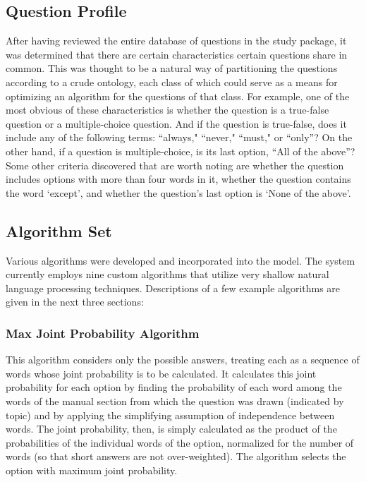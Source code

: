\subsection{Question Profile}

After having reviewed the entire database of questions in the study package, it was determined that there are certain characteristics certain questions share in common.  This was thought to be a natural way of partitioning the questions according to a crude ontology, each class of which could serve as a means for optimizing an algorithm for the questions of that class.  For example, one of the most obvious of these characteristics is whether the question is a true-false question or a multiple-choice question.  And if the question is true-false, does it include any of the following terms:  ``always," ``never," ``must," or ``only''?  On the other hand, if a question is multiple-choice, is its last option, ``All of the above''?  Some other criteria discovered that are worth noting are whether the question includes options with more than four words in it, whether the question contains the word `except', and whether the question's last option is `None of the above'.

\subsection{Algorithm Set}

Various algorithms were developed and incorporated into the model.  The system currently employs nine custom algorithms that utilize very shallow natural language processing techniques.  Descriptions of a few example algorithms are given in the next three sections:

\subsubsection{Max Joint Probability Algorithm}

This algorithm considers only the possible answers, treating each as a sequence of words whose joint probability is to be calculated.  It calculates this joint probability for each option by finding the probability of each word among the words of the manual section from which the question was drawn (indicated by topic) and by applying the simplifying assumption of independence between words.  The joint probability, then, is simply calculated as the product of the probabilities of the individual words of the option, normalized for the number of words (so that short answers are not over-weighted).  The algorithm selects the option with maximum joint probability.

